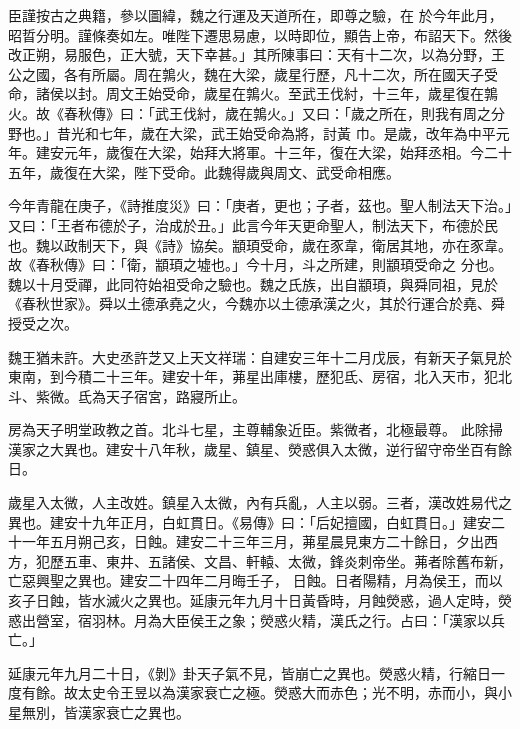 \begin{pinyinscope}
 臣謹按古之典籍，參以圖緯，魏之行運及天道所在，即尊之驗，在
 於今年此月，昭晢分明。謹條奏如左。唯陛下遷思易慮，以時即位，顯告上帝，布詔天下。然後改正朔，易服色，正大號，天下幸甚。」其所陳事曰：天有十二次，以為分野，王公之國，各有所屬。周在鶉火，魏在大梁，歲星行歷，凡十二次，所在國天子受命，諸侯以封。周文王始受命，歲星在鶉火。至武王伐紂，十三年，歲星復在鶉火。故《春秋傳》曰：「武王伐紂，歲在鶉火。」又曰：「歲之所在，則我有周之分野也。」昔光和七年，歲在大梁，武王始受命為將，討黃
 巾。是歲，改年為中平元年。建安元年，歲復在大梁，始拜大將軍。十三年，復在大梁，始拜丞相。今二十五年，歲復在大梁，陛下受命。此魏得歲與周文、武受命相應。



 今年青龍在庚子，《詩推度災》曰：「庚者，更也；子者，茲也。聖人制法天下治。」又曰：「王者布德於子，治成於丑。」此言今年天更命聖人，制法天下，布德於民也。魏以政制天下，與《詩》協矣。顓頊受命，歲在豕韋，衛居其地，亦在豕韋。故《春秋傳》曰：「衛，顓頊之墟也。」今十月，斗之所建，則顓頊受命之
 分也。魏以十月受禪，此同符始祖受命之驗也。魏之氏族，出自顓頊，與舜同祖，見於《春秋世家》。舜以土德承堯之火，今魏亦以土德承漢之火，其於行運合於堯、舜授受之次。



 魏王猶未許。大史丞許芝又上天文祥瑞：自建安三年十二月戊辰，有新天子氣見於東南，到今積二十三年。建安十年，茀星出庫樓，歷犯氐、房宿，北入天市，犯北斗、紫微。氐為天子宿宮，路寢所止。



 房為天子明堂政教之首。北斗七星，主尊輔象近臣。紫微者，北極最尊。
 此除掃漢家之大異也。建安十八年秋，歲星、鎮星、熒惑俱入太微，逆行留守帝坐百有餘日。



 歲星入太微，人主改姓。鎮星入太微，內有兵亂，人主以弱。三者，漢改姓易代之異也。建安十九年正月，白虹貫日。《易傳》曰：「后妃擅國，白虹貫日。」建安二十一年五月朔己亥，日蝕。建安二十三年三月，茀星晨見東方二十餘日，夕出西方，犯歷五車、東井、五諸侯、文昌、軒轅、太微，鋒炎刺帝坐。茀者除舊布新，亡惡興聖之異也。建安二十四年二月晦壬子，
 日蝕。日者陽精，月為侯王，而以亥子日蝕，皆水滅火之異也。延康元年九月十日黃昏時，月蝕熒惑，過人定時，熒惑出營室，宿羽林。月為大臣侯王之象；熒惑火精，漢氏之行。占曰：「漢家以兵亡。」



 延康元年九月二十日，《剝》卦天子氣不見，皆崩亡之異也。熒惑火精，行縮日一度有餘。故太史令王昱以為漢家衰亡之極。熒惑大而赤色；光不明，赤而小，與小星無別，皆漢家衰亡之異也。




\end{pinyinscope}
